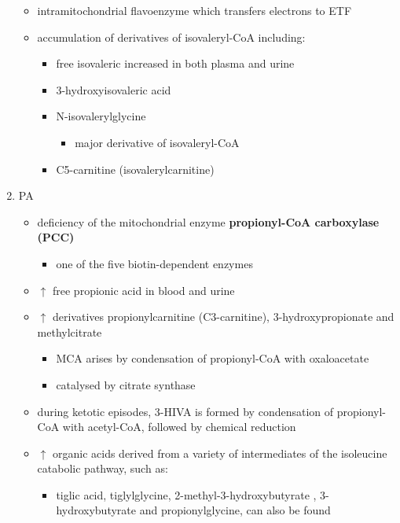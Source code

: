 \documentclass{scrartcl}
\begin{document}
\begin{enumerate}

\begin{itemize}
\item intramitochondrial flavoenzyme which transfers electrons to ETF
\end{itemize}
\begin{itemize}
\item accumulation of derivatives of isovaleryl-CoA including:
\begin{itemize}
\item free isovaleric increased in both plasma and urine
\item 3-hydroxyisovaleric acid
\item N-isovalerylglycine
\begin{itemize}
\item major derivative of isovaleryl-CoA
\end{itemize}
\item C5-carnitine (isovalerylcarnitine)
\end{itemize}
\end{itemize}

\item PA
\label{sec:org0ec0dcb}
\begin{itemize}
\item deficiency of the mitochondrial enzyme \textbf{propionyl-CoA carboxylase (PCC)}
\begin{itemize}
\item one of the five biotin-dependent enzymes
\end{itemize}
\end{itemize}
\begin{itemize}
\item \(\uparrow\) free propionic acid in blood and urine
\item \(\uparrow\) derivatives propionylcarnitine (C3-carnitine),
3-hydroxypropionate and methylcitrate
\begin{itemize}
\item MCA arises by condensation of propionyl-CoA with oxaloacetate
\item catalysed by citrate synthase
\end{itemize}
\item during ketotic episodes, 3-HIVA is formed by condensation of
propionyl-CoA with acetyl-CoA, followed by chemical reduction
\item \(\uparrow\) organic acids derived from a variety of intermediates of
the isoleucine catabolic pathway, such as:
\begin{itemize}
\item tiglic acid, tiglylglycine, 2-methyl-3-hydroxybutyrate ,
3-hydroxybutyrate and propionylglycine, can also be found
\end{itemize}
\end{itemize}


\end{enumerate}
\end{document}
